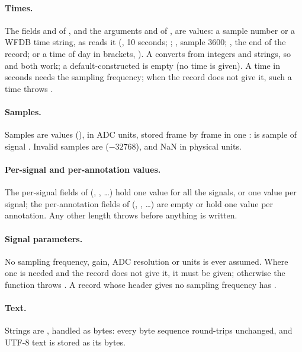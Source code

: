 \paragraph{Times.} The fields  and  of , and the
arguments  and  of , are 
values: a sample number or a WFDB time string, as  reads it (,
10 seconds; ; , sample 3600; , the end of the
record; or a time of day in brackets, ). A  converts
from integers and strings, so  and  both
work; a default-constructed  is empty (no time is given). A time in seconds
needs the sampling frequency; when the record does not give it, such a time throws
.

\paragraph{Samples.} Samples are  values (), in ADC units,
stored frame by frame in one :  is sample
 of signal . Invalid samples are 
($-32768$), and NaN in physical units.

\paragraph{Per-signal and per-annotation values.} The per-signal fields of
 (, , \ldots) hold one value for all the
signals, or one value per signal; the per-annotation fields of 
(, , \ldots) are empty or hold one value per annotation. Any
other length throws  before anything is written.

\paragraph{Signal parameters.} No sampling frequency, gain, ADC resolution or units is
ever assumed. Where one is needed and the record does not give it, it must be given;
otherwise the function throws . A record whose header gives no sampling
frequency has .

\paragraph{Text.} Strings are , handled as bytes: every byte sequence
round-trips unchanged, and UTF-8 text is stored as its bytes.

